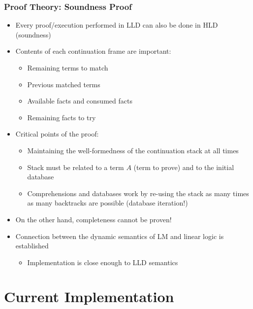 \documentclass{beamer}
\begin{document}
\begin{frame}[fragile]
   \frametitle{Proof Theory: Soundness Proof}
   \begin{itemize}
      \item Every proof/execution performed in LLD can also be done in HLD (soundness)
      \item Contents of each continuation frame are important:
      \begin{itemize}
         \item Remaining terms to match
         \item Previous matched terms
         \item Available facts and consumed facts
         \item Remaining facts to try
      \end{itemize}
      \pause
      \item Critical points of the proof:
      \begin{itemize}
         \item Maintaining the well-formedness of the continuation stack at all times
         \item Stack must be related to a term $A$ (term to prove) and to the initial database
         \item Comprehensions and databases work by re-using the stack as many times as many backtracks are possible (database iteration!)
      \end{itemize}
      \pause
      \item On the other hand, completeness cannot be proven!
      \pause
      \item Connection between the dynamic semantics of LM and linear logic is established
      \begin{itemize}
         \item Implementation is close enough to LLD semantics
      \end{itemize}
   \end{itemize}
\end{frame}

\section{Current Implementation}
\end{document}
